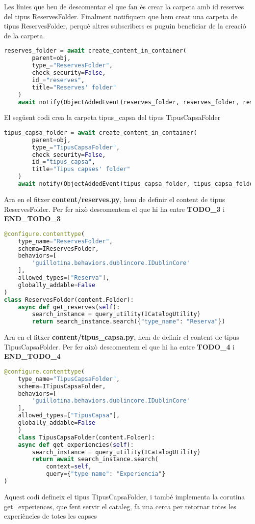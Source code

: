 \documentclass[a4paper, 11pt]{article}
\begin{document}
Les línies que heu de descomentar el que fan és crear la carpeta amb
id reserves del tipus ReservesFolder. Finalment notifiquem que hem
creat una carpeta de tipus ReservesFolder, perquè altres subscribers
es puguin beneficiar de la creació de la carpeta.
\begin{lstlisting}[language=Python, caption=Creació reserves folder]
  reserves_folder = await create_content_in_container(
        parent=obj,
        type_="ReservesFolder",
        check_security=False,
        id_="reserves",
        title="Reserves' folder"
    )
    await notify(ObjectAddedEvent(reserves_folder, reserves_folder, reserves_folder.id))
\end{lstlisting}

El següent codi crea la carpeta tipus\_capsa del tipus TipusCapsaFolder
\begin{lstlisting}[language=Python, caption=Creació tipus\_capsa]
  tipus_capsa_folder = await create_content_in_container(
        parent=obj,
        type_="TipusCapsaFolder",
        check_security=False,
        id_="tipus_capsa",
        title="Tipus capses' folder"
    )
    await notify(ObjectAddedEvent(tipus_capsa_folder, tipus_capsa_folder, tipus_capsa_folder.id))
  \end{lstlisting}

  Ara en el fitxer \textbf{content/reserves.py}, hem de definir el content de tipus
  ReservesFolder. Per fer això descomentem el que hi ha entre
  \textbf{TODO\_3} i \textbf{END\_TODO\_3}

  \begin{lstlisting}[language=Python, caption=Configuració content ReservesFolder]
  @configure.contenttype(
    type_name="ReservesFolder",
    schema=IReservesFolder,
    behaviors=[
        'guillotina.behaviors.dublincore.IDublinCore'
    ],
    allowed_types=["Reserva"],
    globally_addable=False
)
class ReservesFolder(content.Folder):
    async def get_reserves(self):
        search_instance = query_utility(ICatalogUtility)
        return search_instance.search({"type_name": "Reserva"})
      \end{lstlisting}

  Ara en el fitxer \textbf{content/tipus\_capsa.py}, hem de definir el content de tipus
  TipusCapsaFolder. Per fer això descomentem el que hi ha entre
  \textbf{TODO\_4} i \textbf{END\_TODO\_4}

  \begin{lstlisting}[language=Python, caption=Configuració content ReservesFolder]
    @configure.contenttype(
    type_name="TipusCapsaFolder",
    schema=ITipusCapsaFolder,
    behaviors=[
        'guillotina.behaviors.dublincore.IDublinCore'
    ],
    allowed_types=["TipusCapsa"],
    globally_addable=False
    )
    class TipusCapsaFolder(content.Folder):
    async def get_experiencies(self):
        search_instance = query_utility(ICatalogUtility)
        return await search_instance.search(
            context=self,
            query={"type_name": "Experiencia"}
)
\end{lstlisting}
Aquest codi defineix el tipus TipusCapsaFolder, i també implementa la
corutina get\_experiences, que fent servir el cataleg, fa una cerca per
retornar totes les experiències de totes les capses
  
\end{document}
